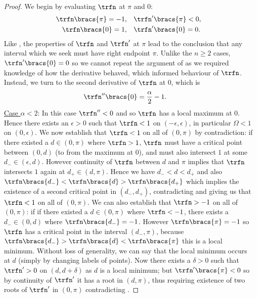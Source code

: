\begin{proof}
	We begin by evaluating $\trfn$ at $\pi$ and 0:
	\begin{align*}
		\trfn\bracs{\pi} = -1,		&\quad \trfn^{\prime}\bracs{\pi} < 0, \\
		\trfn\bracs{0} = 1,		&\quad \trfn^{\prime}\bracs{0} = 0.
	\end{align*}
	Like , the properties of $\trfn$ and $\trfn^{\prime}$ at $\pi$ lead to the conclusion that any interval which we seek must have right endpoint $\pi$.
	Unlike the $n\geq2$ cases, $\trfn^{\prime}\bracs{0}=0$ so we cannot repeat the argument of  as we required knowledge of how the derivative behaved, which informed behaviour of $\trfn$.
	Instead, we turn to the second derivative of $\trfn$ at 0, which is
	\begin{align*}
		\trfn^{\prime\prime}\bracs{0} &= \frac{\alpha}{2}-1.
	\end{align*} \newline
	\underline{Case $\alpha<2$}: In this case $\trfn^{\prime\prime}<0$ and so $\trfn$ has a local maximum at 0.
	Hence there exists an $\epsilon>0$ such that $\trfn<1$ on $(-\epsilon, \epsilon)$, in particular $\Omega<1$ on $(0, \epsilon)$.
	We now establish that $\trfn<1$ on all of $(0,\pi)$ by contradiction: if there existed a $d\in(0,\pi)$ where $\trfn>1$, $\trfn$ must have a critical point between $(0,d)$ (to  from the maximum at 0), and must also intersect $1$ at some $d_{-}\in(\epsilon,d)$. 
	However continuity of $\trfn$ between $d$ and $\pi$ implies that $\trfn$ intersects $1$ again at $d_{+}\in(d, \pi)$.
	Hence we have $d_{-} <d < d_{+}$ and also $\trfn\bracs{d_{-}} < \trfn\bracs{d} > \trfn\bracs{d_{+}}$ which implies the existence of a second critical point in $(d_{-},d_{+})$, contradicting  and giving us that $\trfn<1$ on all of $(0,\pi)$.
	We can also establish that $\trfn>-1$ on all of $(0,\pi)$: if if there existed a $d\in(0,\pi)$ where $\trfn<-1$, there exists a $d_{-}\in(0,d)$ where $\trfn\bracs{d_{-}}=-1$.
	However $\trfn\bracs{\pi}=-1$ so $\trfn$ has a critical point in the interval $(d_{-},\pi)$, because $\trfn\bracs{d_{-}}>\trfn\bracs{d}<\trfn\bracs{\pi}$ this is a local minimum.
	Without loss of generality, we can say that the local minimum occurs at $d$ (simply by changing labels of points).
	Now there exists a $\delta>0$ such that $\trfn^{\prime}>0$ on $(d,d+\delta)$ as $d$ is a local minimum; but $\trfn^{\prime}\bracs{\pi}<0$ so by continuity of $\trfn^{\prime}$ it has a root in $(d, \pi)$, thus requiring existence of two roots of $\trfn^{\prime}$ in $(0,\pi)$ contradicting .

\end{proof}
